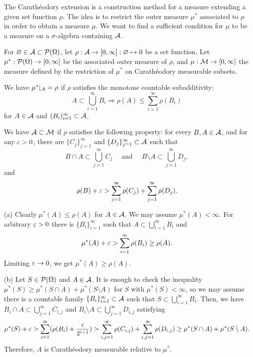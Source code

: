 \documentclass{../../large}
\begin{document}
\begin{prb}
The Carath\'eodory extension is a construction method for a measure extending a given set function $\rho$.
The idea is to restrict the outer measure $\mu^*$ associated to $\rho$ in order to obtain a measure $\mu$.
We want to find a sufficient condition for $\mu$ to be a measure on a $\sigma$-algebra containing $\mathcal{A}$.

For $\varnothing\in\mathcal{A}\subset\mathcal{P}(\Omega)$, let $\rho:\mathcal{A}\to[0,\infty]:\varnothing\mapsto0$ be a set function.
Let $\mu^*:\mathcal{P}(\Omega)\to[0,\infty]$ be the associated outer measure of $\rho$, and $\mu:\mathcal{M}\to[0,\infty]$ the measure defined by the restriction of $\mu^*$ on Carath\'eodory measurable subsets.
\begin{parts}
\item We have $\mu^*|_{\mathcal{A}}=\rho$ if $\rho$ satisfies the monotone countable subadditivity:
\[A\subset\bigcup_{i=1}^\infty B_i\Rightarrow\rho(A)\le\sum_{i=1}^\infty\rho(B_i)\]
for $A\in\mathcal{A}$ and $(B_i)_{i=1}^\infty\subset\mathcal{A}$.
\item We have $\mathcal{A}\subset\mathcal{M}$ if $\rho$ satisfies the following property: for every $B,A\in\mathcal{A}$, and for any $\varepsilon>0$, there are $\{C_j\}_{j=1}^\infty$ and $\{D_j\}_{j=1}^\infty\subset\mathcal{A}$ such that
\[B\cap A\subset\bigcup_{j=1}^\infty C_j\quad\text{ and }\quad B\setminus A\subset\bigcup_{j=1}^\infty D_j,\]
and
\[\rho(B)+\varepsilon>\sum_{j=1}^\infty\rho(C_j)+\sum_{j=1}^\infty\rho(D_j).\]
\end{parts}
\end{prb}
\begin{pf}
(a)
Clearly $\mu^*(A)\le\rho(A)$ for $A\in\mathcal{A}$.
We may assume $\mu^*(A)<\infty$.
For arbitrary $\varepsilon>0$ there is $\{B_i\}_{i=1}^\infty$ such that $A\subset\bigcup_{i=1}^\infty B_i$ and
\[\mu^*(A)+\varepsilon>\sum_{i=1}^\infty\rho(B_i)\ge\rho(A).\]
Limiting $\varepsilon\to0$, we get $\mu^*(A)\ge\rho(A)$.

(b)
Let $S\in\mathcal{P}(\Omega)$ and $A\in\mathcal{A}$.
It is enough to check the inequality $\mu^*(S)\ge\mu^*(S\cap A)+\mu^*(S\setminus A)$ for $S$ with $\mu^*(S)<\infty$, so we may assume there is a countable family $\{B_i\}_{i=1}^\infty\subset\mathcal{A}$ such that $S\subset\bigcup_{i=1}^\infty B_i$.
Then, we have $B_i\cap A\subset\bigcup_{j=1}^\infty C_{i,j}$ and $B_i\setminus A\subset\bigcup_{j=1}^\infty D_{i,j}$ satisfying
\[\mu^*(S)+\varepsilon>\sum_{i=1}^\infty(\rho(B_i)+\frac{\varepsilon}{2^{i+1}})
>\sum_{i,j=1}^\infty\rho(C_{i,j})+\sum_{i,j=1}^\infty\rho(D_{i,j})\ge\mu^*(S\cap A)+\mu^*(S\setminus A).\]
Therefore, $A$ is Carath\'eodory measurable relative to $\mu^*$.
\end{pf}
\end{document}
